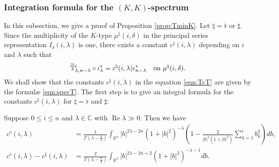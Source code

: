 \subsubsection{Integration formula for the $(K,K)$-spectrum}
\label{subsec:Tspec}
In this subsection,
 we give a proof of Proposition \ref{prop:TminK}.  
Let $\natural = \flat$ or $\sharp$.  
Since the multiplicity
 of the $K$-type
 $\mu^{\natural}(i,\delta)$
 in the principal series representation $I_{\delta}(i,\lambda)$
 is one,
 there exists a constant $c^{\natural}(i,\lambda)$
 depending on $i$ and $\lambda$
 such that
\begin{equation}
\label{eqn:TcT}
\widetilde{{\mathbb{T}}}_{{\lambda},{n-\lambda}}^{{i}} \circ \iota_{\lambda}^{\ast}
=
c^{\natural}(i,\lambda)
\iota_{n-\lambda}^{\ast}
\quad
\text{on $\mu^{\natural}(i,\delta)$}.  
\end{equation}
We shall show
 that the constants $c^{\natural}(i,\lambda)$
 in the equation \eqref{eqn:TcT}
 are given by the formul{\ae} \eqref{eqn:specT}.  
The first step is to give an integral formula 
 for the constants 
$
c^{\natural}(i,\lambda)
$
for $\natural = \flat$ and $\sharp$:
\begin{lemma}
\label{lem:161783}
Suppose $0 \le i \le n$
 and $\lambda \in {\mathbb{C}}$
 with $\operatorname{Re} \lambda \gg 0$. 
Then we have  
\begin{align*}
  c^{\flat}(i,\lambda)
  &=
  \frac{1}{\Gamma(\lambda-\frac n 2)}
  \int_{{\mathbb{R}}^n} |b|^{2\lambda-2n}
                        (1+|b|^2)^{-\lambda} 
  \left(1-\frac{2}{|b|^2(1+|b|^2)}\sum_{k=1}^{i} b_k^2\right) d b,
\\
  c^{\flat}(i,\lambda) - c^{\sharp}(i,\lambda)
  &=
  \frac{2}{\Gamma(\lambda-\frac n 2)}
  \int_{{\mathbb{R}}^n} |b|^{2\lambda-2n+2}
                        (1+|b|^2)^{-\lambda-1} d b.  
\end{align*}
\end{lemma}

